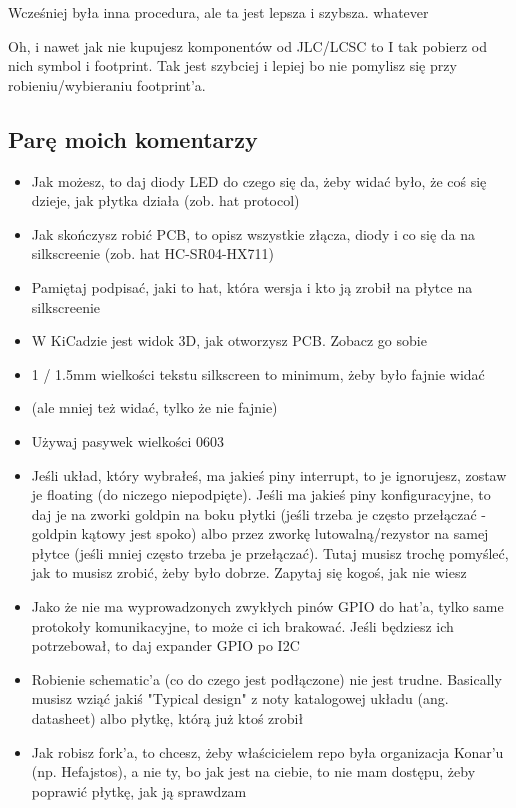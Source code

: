\documentclass[b5paper, 10pt, twoside]{book}
\begin{document}
Wcześniej była inna procedura, ale ta jest lepsza i szybsza. whatever

Oh, i nawet jak nie kupujesz komponentów od JLC/LCSC to I tak pobierz od nich symbol i footprint. Tak jest szybciej i lepiej bo nie pomylisz się przy robieniu/wybieraniu footprint'a.



\subsection{Parę moich komentarzy}
\begin{itemize}
  \item Jak możesz, to daj diody LED do czego się da, żeby widać było, że coś się dzieje, jak płytka działa (zob. hat protocol)
  \item Jak skończysz robić PCB, to opisz wszystkie złącza, diody i co się da na silkscreenie (zob. hat HC-SR04-HX711)
  \item Pamiętaj podpisać, jaki to hat, która wersja i kto ją zrobił na płytce na silkscreenie
  \item W KiCadzie jest widok 3D, jak otworzysz PCB. Zobacz go sobie
  \item 1 / 1.5mm wielkości tekstu silkscreen to minimum, żeby było fajnie widać
  \item (ale mniej też widać, tylko że nie fajnie)
  \item Używaj pasywek wielkości 0603
  \item Jeśli układ, który wybrałeś, ma jakieś piny interrupt, to je ignorujesz,
        zostaw je floating (do niczego niepodpięte). Jeśli ma jakieś piny konfiguracyjne, to daj je na zworki goldpin na boku płytki (jeśli trzeba je często przełączać - goldpin kątowy jest spoko) albo przez zworkę lutowalną/rezystor na samej płytce (jeśli mniej często trzeba je przełączać). Tutaj musisz trochę pomyśleć, jak to musisz zrobić, żeby było dobrze. Zapytaj się kogoś, jak nie wiesz
  \item Jako że nie ma wyprowadzonych zwykłych pinów GPIO do hat'a, tylko same protokoły komunikacyjne, to może ci ich brakować. Jeśli będziesz ich potrzebował, to daj expander GPIO po I2C
  \item Robienie schematic'a (co do czego jest podłączone) nie jest trudne. Basically musisz wziąć jakiś "Typical design" z noty katalogowej układu (ang. datasheet) albo płytkę, którą już ktoś zrobił
  \item Jak robisz fork'a, to chcesz, żeby właścicielem repo była organizacja Konar'u (np. Hefajstos), a nie ty, bo jak jest na ciebie, to nie mam dostępu, żeby poprawić płytkę, jak ją sprawdzam

\end{itemize}
\end{document}
